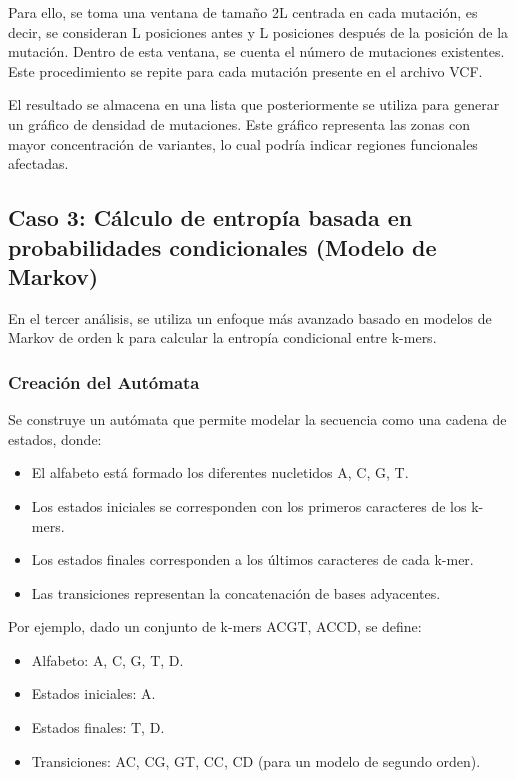 \documentclass[11pt,spanish,listoffigures,listoftables]{tfgetsinf}
\begin{document}
Para ello, se toma una ventana de tamaño 2L centrada en cada mutación, es decir, se consideran L posiciones antes y L posiciones después de la posición de la mutación. Dentro de esta ventana, se cuenta el número de mutaciones existentes. Este procedimiento se repite para cada mutación presente en el archivo VCF.

El resultado se almacena en una lista que posteriormente se utiliza para generar un gráfico de densidad de mutaciones. Este gráfico representa las zonas con mayor concentración de variantes, lo cual podría indicar regiones funcionales afectadas.


\subsection{Caso 3: Cálculo de entropía basada en probabilidades condicionales (Modelo de Markov)}

En el tercer análisis, se utiliza un enfoque más avanzado basado en modelos de Markov de orden k para calcular la entropía condicional entre k-mers.

\subsubsection{Creación del Autómata}

Se construye un autómata que permite modelar la secuencia como una cadena de
estados, donde:

\begin{itemize}
   \item El alfabeto está formado los diferentes nucletidos {A, C, G, T}.
   \item Los estados iniciales se corresponden con los primeros caracteres de los k-mers.
   \item Los estados finales corresponden a los últimos caracteres de cada k-mer.
   \item Las transiciones representan la concatenación de bases adyacentes.
\end{itemize}


Por ejemplo, dado un conjunto de k-mers {ACGT, ACCD}, se define:

\begin{itemize}
   \item Alfabeto: {A, C, G, T, D}.
   \item Estados iniciales: {A}.
   \item Estados finales: {T, D}.
   \item Transiciones: {AC, CG, GT, CC, CD} (para un modelo de segundo orden).
\end{itemize}
\end{document}
